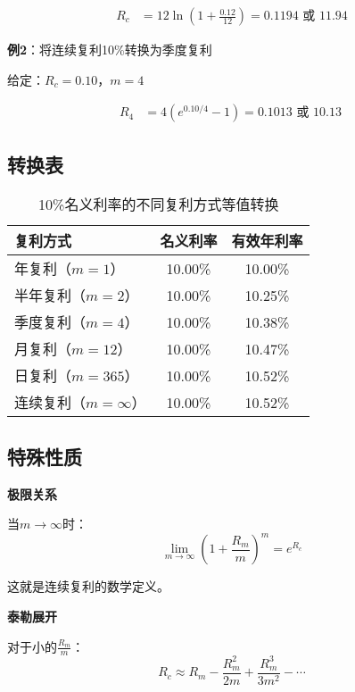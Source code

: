 \begin{align}
R_c &= 12 \ln\left(1 + \frac{0.12}{12}\right) = 0.1194 \text{ 或 } 11.94
\end{align}

\textbf{例2}：将连续复利10\%转换为季度复利

给定：$R_c = 0.10$，$m = 4$

\begin{align}
R_4 &= 4\left(e^{0.10/4} - 1\right) = 0.1013 \text{ 或 } 10.13\
\end{align}

\subsection{转换表}

\begin{table}[H]
\centering
\caption{10\%名义利率的不同复利方式等值转换}
\begin{tabular}{|l|c|c|}
\hline
\textbf{复利方式} & \textbf{名义利率} & \textbf{有效年利率} \\
\hline
年复利（$m=1$） & 10.00\% & 10.00\% \\
半年复利（$m=2$） & 10.00\% & 10.25\% \\
季度复利（$m=4$） & 10.00\% & 10.38\% \\
月复利（$m=12$） & 10.00\% & 10.47\% \\
日复利（$m=365$） & 10.00\% & 10.52\% \\
连续复利（$m=\infty$） & 10.00\% & 10.52\% \\
\hline
\end{tabular}
\end{table}

\subsection{特殊性质}

\textbf{极限关系}

当$m \to \infty$时：
\begin{equation}
\lim_{m \to \infty} \left(1 + \frac{R_m}{m}\right)^m = e^{R_c}
\end{equation}

这就是连续复利的数学定义。

\textbf{泰勒展开}

对于小的$\frac{R_m}{m}$：
\begin{equation}
R_c \approx R_m - \frac{R_m^2}{2m} + \frac{R_m^3}{3m^2} - \cdots
\end{equation}

